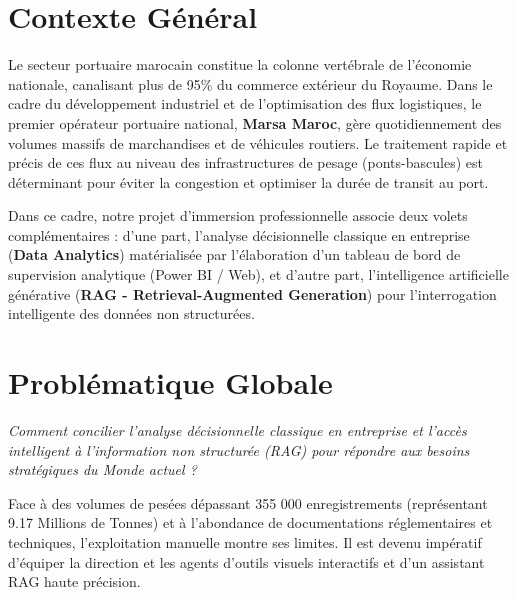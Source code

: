 \documentclass[12pt,a4paper,oneside]{report}
\begin{document}
\section*{Contexte Général}
Le secteur portuaire marocain constitue la colonne vertébrale de l'économie nationale, canalisant plus de 95\% du commerce extérieur du Royaume. Dans le cadre du développement industriel et de l'optimisation des flux logistiques, le premier opérateur portuaire national, \textbf{Marsa Maroc}, gère quotidiennement des volumes massifs de marchandises et de véhicules routiers. Le traitement rapide et précis de ces flux au niveau des infrastructures de pesage (ponts-bascules) est déterminant pour éviter la congestion et optimiser la durée de transit au port.

Dans ce cadre, notre projet d'immersion professionnelle associe deux volets complémentaires : d'une part, l'analyse décisionnelle classique en entreprise (\textbf{Data Analytics}) matérialisée par l'élaboration d'un tableau de bord de supervision analytique (Power BI / Web), et d'autre part, l'intelligence artificielle générative (\textbf{RAG - Retrieval-Augmented Generation}) pour l'interrogation intelligente des données non structurées.

\section*{Problématique Globale}
\begin{center}
\textit{Comment concilier l'analyse décisionnelle classique en entreprise et l'accès intelligent à l'information non structurée (RAG) pour répondre aux besoins stratégiques du Monde actuel ?}
\end{center}

Face à des volumes de pesées dépassant 355 000 enregistrements (représentant 9.17 Millions de Tonnes) et à l'abondance de documentations réglementaires et techniques, l'exploitation manuelle montre ses limites. Il est devenu impératif d'équiper la direction et les agents d'outils visuels interactifs et d'un assistant RAG haute précision.
\end{document}
